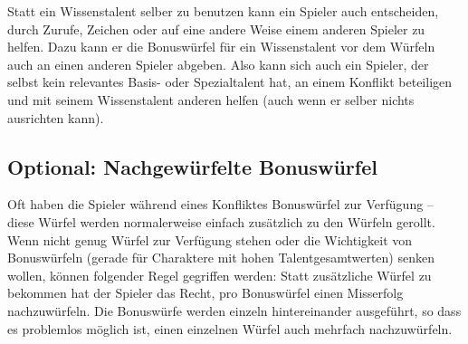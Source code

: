 Statt ein Wissenstalent selber zu benutzen kann ein Spieler auch entscheiden, durch Zurufe, Zeichen oder auf eine andere Weise einem anderen Spieler zu helfen. Dazu kann er die Bonuswürfel für ein Wissenstalent vor dem Würfeln auch an einen anderen Spieler abgeben. Also kann sich auch ein Spieler, der selbst kein relevantes Basis- oder Spezialtalent hat, an einem Konflikt beteiligen und mit seinem Wissenstalent anderen helfen (auch wenn er selber nichts ausrichten kann).

\begin{optional}
\section{Optional: Nachgewürfelte Bonuswürfel}

Oft haben die Spieler während eines Konfliktes Bonuswürfel zur Verfügung -- diese Würfel werden normalerweise einfach zusätzlich zu den Würfeln gerollt. Wenn nicht genug Würfel zur Verfügung stehen oder die Wichtigkeit von Bonuswürfeln (gerade für Charaktere mit hohen Talentgesamtwerten) senken wollen, können folgender Regel gegriffen werden: Statt zusätzliche Würfel zu bekommen hat der Spieler das Recht, pro Bonuswürfel einen Misserfolg nachzuwürfeln. Die Bonuswürfe werden einzeln hintereinander ausgeführt, so dass es problemlos möglich ist, einen einzelnen Würfel auch mehrfach nachzuwürfeln.
\end{optional}


